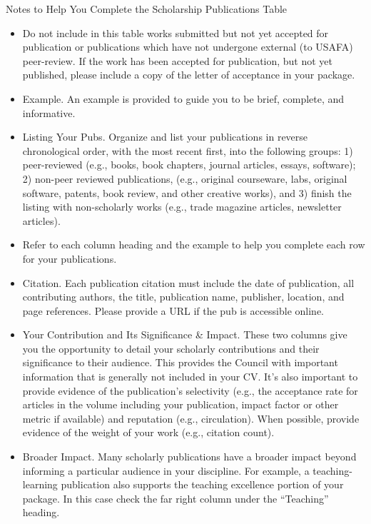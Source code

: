 \documentclass[11pt,titlepage]{article}
\begin{document}
Notes to Help You Complete the Scholarship Publications Table
\begin{itemize}
  \item
  Do not include in this table works submitted but not yet accepted for publication or publications which have not undergone external (to USAFA) peer-review.
  If the work has been accepted for publication, but not yet published, please include a copy of the letter of acceptance in your package.

  \item
  Example.
  An example is provided to guide you to be brief, complete, and informative.

  \item
  Listing Your Pubs.
  Organize and list your publications in reverse chronological order, with
the most recent first, into the following groups: 1) peer-reviewed (e.g., books, book chapters, journal articles, essays, software); 2) non-peer reviewed publications, (e.g., original courseware, labs, original software, patents, book review, and other creative works), and 3) finish the listing with non-scholarly works (e.g., trade magazine articles, newsletter articles).

  \item
  Refer to each column heading and the example to help you complete each row for your publications.

  \item
  Citation.
  Each publication citation must include the date of publication, all contributing authors, the title, publication name, publisher, location, and page references.
  Please provide a URL if the pub is accessible online.

  \item
  Your Contribution and Its Significance \& Impact.
  These two columns give you the opportunity to detail your scholarly contributions and their significance to their audience.
  This provides the Council with important information that is generally not included in your \gls{CV}.
  It's also important to provide evidence of the publication's selectivity (e.g., the acceptance rate for articles in the volume including your publication, impact factor or other metric if available) and reputation (e.g., circulation).
  When possible, provide evidence of the weight of your work (e.g., citation count).

  \item
  Broader Impact.
  Many scholarly publications have a broader impact beyond informing a particular audience in your discipline.
  For example, a teaching-learning publication also supports the teaching excellence portion of your package.
  In this case check the far right column under the ``Teaching'' heading.
\end{itemize}
\end{document}
